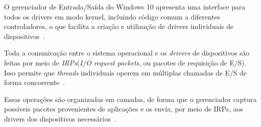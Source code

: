 O gerenciador de Entrada/Saída do Windows 10 apresenta uma interface para todos os drivers em modo kernel, incluindo código comum a diferentes controladores, o que facilita a criação e utilização de drivers individuais de dispositivos~\cite{w10_io_manager, internals_pt2}.

Toda a comunicação entre o sistema operacional e os \emph{drivers} de dispositivos são feitas por meio de \emph{IRPs}(\emph{I/O request packets}, ou pacotes de requisição de E/S). Isso permite que \emph{threads} individuais operem em múltiplas chamadas de E/S de forma concorrente~\cite{internals_pt2}. 

Essas operações são organizadas em camadas, de forma que o gerenciador captura possíveis pacotes provenientes de aplicações e os envia, por meio de IRPs, aos drivers dos dispositivos necessários~\cite{w10_io_manager}.  


